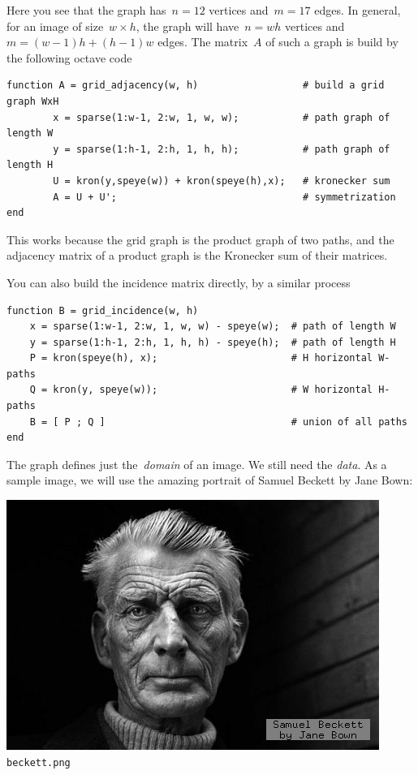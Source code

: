 Here you see that the graph has~$n=12$ vertices and~$m=17$ edges.
In general, for an image of size~$w\times h$, the graph will have~$n=wh$
vertices and~$m=(w-1)h+(h-1)w$ edges.  The matrix~$A$ of such a graph is
build by the following octave code

\begin{verbatim}
function A = grid_adjacency(w, h)                  # build a grid graph WxH
        x = sparse(1:w-1, 2:w, 1, w, w);           # path graph of length W
        y = sparse(1:h-1, 2:h, 1, h, h);           # path graph of length H
        U = kron(y,speye(w)) + kron(speye(h),x);   # kronecker sum
        A = U + U';                                # symmetrization
end
\end{verbatim}

This works because the grid graph is the product graph of two paths, and the
adjacency matrix of a product graph is the Kronecker sum of their matrices.

You can also build the incidence matrix directly, by a similar process

\begin{verbatim}
function B = grid_incidence(w, h)
	x = sparse(1:w-1, 2:w, 1, w, w) - speye(w);  # path of length W
	y = sparse(1:h-1, 2:h, 1, h, h) - speye(h);  # path of length H
	P = kron(speye(h), x);                       # H horizontal W-paths
	Q = kron(y, speye(w));                       # W horizontal H-paths
	B = [ P ; Q ]                                # union of all paths
end
\end{verbatim}

The graph defines just the~\emph{domain} of an image.  We still need the
\emph{data}.  As a sample image, we will use the amazing portrait of Samuel
Beckett by Jane Bown:

\includegraphics{i/beckett.png}
\verb+beckett.png+

